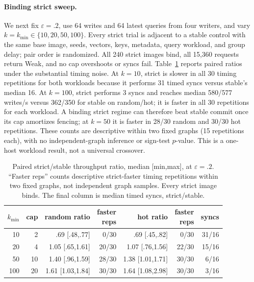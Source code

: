 \documentclass[sigconf,nonacm,balance=false]{acmart}
\begin{document}
\paragraph{Binding strict sweep.}
We next fix $\varepsilon=.2$, use 64 writes and 64 latest queries from four
writers, and vary $k=k_{\min}\in\{10,20,50,100\}$. Every strict trial is adjacent
to a stable control with the same base image, seeds, vectors, keys, metadata,
query workload, and group delay; pair order is randomized. All 240 strict images
bind, all 15{,}360 requests return Weak, and no cap overshoots or syncs fail.
Table~\ref{tab:strictsweep} reports paired ratios under the substantial timing
noise. At $k=10$, strict is slower in all 30 timing repetitions for both
workloads because it performs 31 timed syncs versus stable's median 16. At
$k=100$, strict performs 3 syncs and reaches median 580/577 writes/s versus
362/350 for stable on random/hot; it is faster in all 30 repetitions for each
workload. A binding strict regime can therefore beat stable commit once its cap
amortizes fencing; at $k=50$ it is faster in 28/30 random and 30/30 hot
repetitions. These counts are descriptive within two fixed graphs (15
repetitions each), with no independent-graph inference or sign-test $p$-value.
This is a one-host workload result, not a universal crossover.

\begin{table}[t]
\centering
\caption{Paired strict/stable throughput ratio, median [min,max], at
$\varepsilon=.2$. ``Faster reps'' counts descriptive strict-faster timing
repetitions within two fixed graphs, not independent graph samples. Every strict
image binds. The final column is median timed syncs, strict/stable.}
\label{tab:strictsweep}
\small
\setlength{\tabcolsep}{4pt}
\begin{tabular}{rrrrrrr}
\toprule
$k_{\min}$ & cap & random ratio & \shortstack{faster\\reps} & hot ratio & \shortstack{faster\\reps} & syncs \\
\midrule
10  & 2  & .69 [.48,.77] & 0/30  & .69 [.45,.82] & 0/30  & 31/16 \\
20  & 4  & 1.05 [.65,1.61] & 20/30 & 1.07 [.76,1.56] & 22/30 & 15/16 \\
50  & 10 & 1.40 [.96,1.59] & 28/30 & 1.38 [1.01,1.71] & 30/30 & 6/16 \\
100 & 20 & 1.61 [1.03,1.84] & 30/30 & 1.64 [1.08,2.98] & 30/30 & 3/16 \\
\bottomrule
\end{tabular}
\end{table}
\end{document}
